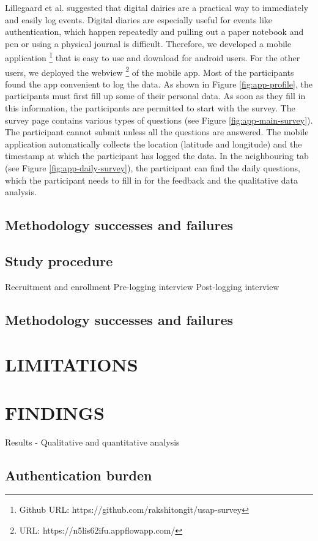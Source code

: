 Lillegaard et al. \cite{lillegaard} suggested that digital dairies are a practical way to immediately and easily log events. Digital diaries are especially useful for events like authentication, which happen repeatedly and pulling out a paper notebook and pen or using a physical journal is difficult. Therefore, we developed a mobile application%
\footnote{Github URL: https://github.com/rakshitongit/usap-survey} that is easy to use and download for android users. For the other users, we deployed the webview%
\footnote{URL: https://n5lis62ifu.appflowapp.com/} of the mobile app. Most of the participants found the app convenient to log the data. As shown in Figure \ref{fig:app-profile}, the participants must first fill up some of their personal data. As soon as they fill in this information, the participants are permitted to start with the survey. The survey page contains various types of questions (see Figure \ref{fig:app-main-survey}). The participant cannot submit unless all the questions are answered. The mobile application automatically collects the location (latitude and longitude) and the timestamp at which the participant has logged the data. In the neighbouring tab (see Figure \ref{fig:app-daily-survey}), the participant can find the daily questions, which the participant needs to fill in for the feedback and the qualitative data analysis. 
\subsection{Methodology successes and failures}
\subsection{Study procedure}
Recruitment and enrollment
Pre-logging interview
Post-logging interview
\subsection{Methodology successes and failures}

\section{LIMITATIONS}
\section{FINDINGS}
Results - Qualitative and quantitative analysis
\subsection{Authentication burden}


